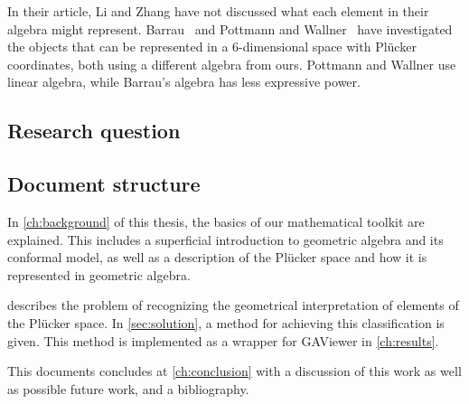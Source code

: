 In their article, Li and Zhang have not discussed what each element in their algebra might represent.  Barrau~\cite{Barrau1,Barrau2} and Pottmann and Wallner~\cite{Pottmann2,Pottmann3} have investigated the objects that can be represented in a 6-dimensional space with Pl\"ucker coordinates, both using a different algebra from ours.  Pottmann and Wallner use linear algebra, while Barrau's algebra has less expressive power.  


\subsection{Research question}


\subsection{Document structure}
In \autoref{ch:background} of this thesis, the basics of our mathematical toolkit are explained.  This includes a superficial introduction to geometric algebra and its conformal model, as well as a description of the Pl\"ucker space and how it is represented in geometric algebra.

 describes the problem of recognizing the geometrical interpretation of elements of the Pl\"ucker space.  In \autoref{sec:solution}, a method for achieving this classification is given.  This method is implemented as a wrapper for GAViewer in \autoref{ch:results}. 

This documents concludes at \autoref{ch:conclusion} with a discussion of this work as well as possible future work, and a bibliography.



